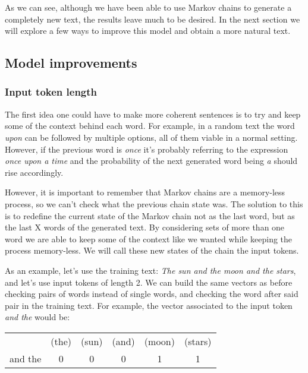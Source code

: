 \documentclass[12pt]{article}
\numberwithin{equation}{section}
\begin{document}
\bigskip

As we can see, although we have been able to use Markov chains to generate a completely new text, the results leave much to be desired. In the next section we will explore a few ways to improve this model and obtain a more natural text.


\subsection{Model improvements}

\subsubsection{Input token length}

The first idea one could have to make more coherent sentences is to try and keep some of the context behind each word. For example, in a random text the word \textit{upon} can be followed by multiple options, all of them viable in a normal setting. However, if the previous word is \textit{once} it's probably referring to the expression \textit{once upon a time} and the probability of the next generated word being \textit{a} should rise accordingly.

However, it is important to remember that Markov chains are a memory-less process, so we can't check what the previous chain state was. The solution to this is to redefine the current state of the Markov chain not as the last word, but as the last X words of the generated text. By considering sets of more than one word we are able to keep some of the context like we wanted while keeping the process memory-less. We will call these new states of the chain the input tokens.

As an example, let's use the training text: \textit{The sun and the moon and the stars}, and let's use input tokens of length 2. We can build the same vectors as before checking pairs of words instead of single words, and checking the word after said pair in the training text. For example, the vector associated to the input token \textit{and the} would be:

\begin{center}
\begin{tabular}{|c|ccccc|}
\hline
  & (the) & (sun) & (and) & (moon) & (stars) \\
 and the & 0 & 0 & 0 & 1 & 1 \\
 \hline
\end{tabular}
\end{center}
\end{document}
